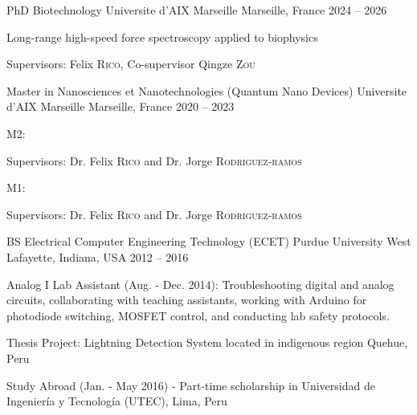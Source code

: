 
\begin{cventries}
  \cventry
  {PhD Biotechnology}
  {Universite d'AIX Marseille}
  {Marseille, France}
  {2024 -- 2026}
  {
    \begin{cvitems}
      \item{{Long-range high-speed force spectroscopy applied to biophysics}}
      \item{Supervisors: Felix \textsc{Rico}, Co-supervisor Qingze \textsc{Zou}}
    \end{cvitems}
    \vspace{1em}
  }

  \cventry
  {Master in Nanosciences et Nanotechnologies (Quantum Nano Devices)}
  {Universite d'AIX Marseille}
  {Marseille, France}
  {2020 -- 2023}
  {
    \begin{cvitems}
      \item{M2: }
      \item{Supervisors: Dr. Felix \textsc{Rico} and Dr. Jorge \textsc{Rodriguez-ramos}}
      \item{M1: }
      \item{Supervisors: Dr. Felix \textsc{Rico} and Dr. Jorge \textsc{Rodriguez-ramos}}
    \end{cvitems}
    \vspace{1em}
  }

  \cventry
  {BS Electrical Computer Engineering Technology (ECET)}
  {Purdue University}
  {West Lafayette, Indiana, USA}
  {2012 -- 2016}
  {
    \begin{cvitems}
      \item{Analog I Lab Assistant (Aug. - Dec. 2014): Troubleshooting digital and analog circuits, collaborating with teaching assistants, working with Arduino for photodiode switching, MOSFET control, and conducting lab safety protocols.}
      \item{Thesis Project: Lightning Detection System located in indigenous region Quehue, Peru}
      \item{Study Abroad (Jan. - May 2016)  - Part-time scholarship in Universidad de Ingeniería y Tecnología (UTEC), Lima, Peru}
    \end{cvitems}
    \vspace{1em}
  }


\end{cventries}
